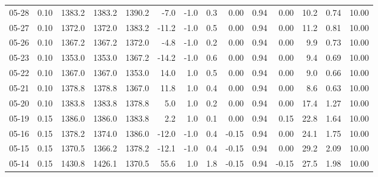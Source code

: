 \begin{threeparttable}
{\begin{tabular}{lrrrrrrrrrrrrr}
  05-28 &     0.10 & 1383.2 & 1383.2 & 1390.2 &       -7.0 &                     -1.0 &                 0.3 &       0.00 &      0.94 &           0.00 &             10.2 &            0.74 &                  10.00 \\
  05-27 &     0.10 & 1372.0 & 1372.0 & 1383.2 &      -11.2 &                     -1.0 &                 0.5 &       0.00 &      0.94 &           0.00 &             11.2 &            0.81 &                  10.00 \\
  05-26 &     0.10 & 1367.2 & 1367.2 & 1372.0 &       -4.8 &                     -1.0 &                 0.2 &       0.00 &      0.94 &           0.00 &              9.9 &            0.73 &                  10.00 \\
  05-23 &     0.10 & 1353.0 & 1353.0 & 1367.2 &      -14.2 &                     -1.0 &                 0.6 &       0.00 &      0.94 &           0.00 &              9.4 &            0.69 &                  10.00 \\
  05-22 &     0.10 & 1367.0 & 1367.0 & 1353.0 &       14.0 &                      1.0 &                 0.5 &       0.00 &      0.94 &           0.00 &              9.0 &            0.66 &                  10.00 \\
  05-21 &     0.10 & 1378.8 & 1378.8 & 1367.0 &       11.8 &                      1.0 &                 0.4 &       0.00 &      0.94 &           0.00 &              8.6 &            0.63 &                  10.00 \\
  05-20 &     0.10 & 1383.8 & 1383.8 & 1378.8 &        5.0 &                      1.0 &                 0.2 &       0.00 &      0.94 &           0.00 &             17.4 &            1.27 &                  10.00 \\
  05-19 &     0.15 & 1386.0 & 1386.0 & 1383.8 &        2.2 &                      1.0 &                 0.1 &       0.00 &      0.94 &           0.15 &             22.8 &            1.64 &                  10.00 \\
  05-16 &     0.15 & 1378.2 & 1374.0 & 1386.0 &      -12.0 &                     -1.0 &                 0.4 &      -0.15 &      0.94 &           0.00 &             24.1 &            1.75 &                  10.00 \\
  05-15 &     0.15 & 1370.5 & 1366.2 & 1378.2 &      -12.1 &                     -1.0 &                 0.4 &      -0.15 &      0.94 &           0.00 &             29.2 &            2.09 &                  10.00 \\
  05-14 &     0.15 & 1430.8 & 1426.1 & 1370.5 &       55.6 &                      1.0 &                 1.8 &      -0.15 &      0.94 &          -0.15 &             27.5 &            1.98 &                  10.00 \\

\end{tabular}}
\end{threeparttable}
